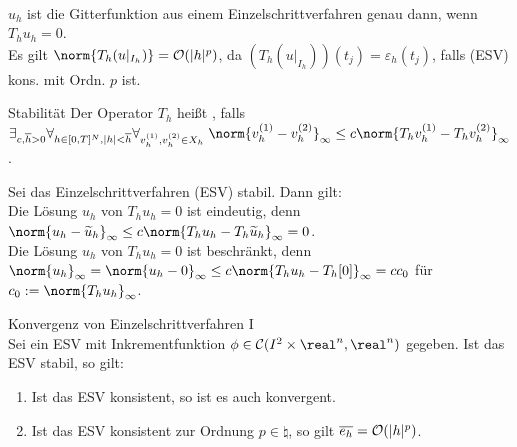 \begin{Bem}\\
    $u_h$ ist die Gitterfunktion aus einem Einzelschrittverfahren genau dann,
    wenn $T_h u_h = 0$.\\
    Es gilt $\norm{T_h(u|_{I_h})} = \O(|h|^p)$,
    da $(T_h (u|_{I_h}))(t_j) = \varepsilon_h(t_j)$,
    falls (ESV) kons. mit Ordn. $p$ ist.
\end{Bem}

\linie
\pagebreak

\begin{Def}{Stabilität}
    Der Operator $T_h$ heißt , falls\\
    $\exists_{c, \overline{h} > 0} \forall_{h \in [0, T]^N, |h| < \overline{h}}
    \forall_{v_h^{(1)}, v_h^{(2)} \in X_h}\;
    \norm{v_h^{(1)} - v_h^{(2)}}_\infty \le
    c \norm{T_h v_h^{(1)} - T_h v_h^{(2)}}_\infty$.
\end{Def}

\begin{Bem}
    Sei das Einzelschrittverfahren (ESV) stabil. Dann gilt:\\
    Die Lösung $u_h$ von $T_h u_h = 0$ ist eindeutig,
    denn $\norm{u_h - \widetilde{u}_h}_\infty \le
    c \norm{T_h u_h - T_h \widetilde{u}_h}_\infty = 0$.\\
    Die Lösung $u_h$ von $T_h u_h = 0$ ist beschränkt,
    denn\\
    $\norm{u_h}_\infty = \norm{u_h - 0}_\infty \le
    c \norm{T_h u_h - T_h[0]}_\infty = c c_0$
    für $c_0 := \norm{T_h u_h}_\infty$.
\end{Bem}

\linie

\begin{Satz}{Konvergenz von Einzelschrittverfahren I}\\
    Sei ein ESV mit Inkrementfunktion
    $\phi \in \C(I^2 \times \real^n, \real^n)$ gegeben.
    Ist das ESV stabil, so gilt:
    \begin{enumerate}[label=(\emph{\roman*})]
        \item
        Ist das ESV konsistent, so ist es auch konvergent.
        
        \item
        Ist das ESV konsistent zur Ordnung $p \in \natural$, so gilt
        $\overline{e_h} = \mathcal{O}(|h|^p)$.
    \end{enumerate}
\end{Satz}

